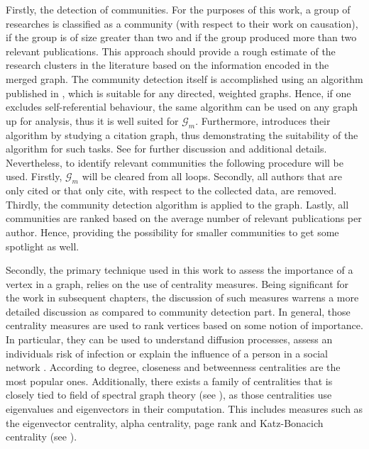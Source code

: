 \documentclass[11pt,a4paper]{book}
\theoremstyle{definition}
\theoremstyle{definition}
\theoremstyle{definition}
\theoremstyle{remark}
\newcommand{\acgraph}{\mathcal{G}_{m}}
\begin{document}
Firstly, the detection of communities. For the purposes of this work, a group of researches is classified as a community (with respect to their work on causation), if the group is of size greater than two and if the group produced more than two relevant publications. This approach should provide a rough estimate of the research clusters in the literature based on the information encoded in the merged graph. 
The community detection itself is accomplished using an algorithm published in \parencite{rosvall2008maps}, which is suitable for any directed, weighted graphs. 
Hence, if one excludes self-referential behaviour, the same algorithm can be used on any graph up for analysis, thus it is well suited for $\acgraph$. Furthermore, \parencite{rosvall2008maps} introduces their algorithm by studying a citation graph, thus demonstrating the suitability of the algorithm for such tasks. See \parencite{rosvall2008maps} for further discussion and additional details. 
Nevertheless, to identify relevant communities the following procedure will be used. 
Firstly, $\acgraph$ will be cleared from all loops. Secondly, all authors that are only cited or that only cite, with respect to the collected data, are removed. 
Thirdly, the community detection algorithm is applied to the graph. Lastly, all communities are ranked based on the average number of relevant publications per author. Hence, providing the possibility for smaller communities to get some spotlight as well.


Secondly, the primary technique used in this work to assess the importance of a vertex in a graph, relies on the use of centrality measures. Being significant for the work in subsequent chapters, the discussion of such measures warrens a more detailed discussion as compared to community detection part. In general, those centrality measures are used to rank vertices based on some notion of importance. In particular, they can be used to understand diffusion processes, assess an individuals risk of infection or explain the influence of a 
person in a social network \parencite{bloch2019centrality}. According to \parencite{del2011centrality} degree, closeness and betweenness centralities are the most popular ones. Additionally, there exists a family of centralities that is closely tied to field of spectral graph theory (see \parencite{spielman2012spectral}), as those centralities use eigenvalues and eigenvectors in their computation. This includes measures such as the eigenvector centrality, alpha centrality, page rank and Katz-Bonacich centrality  (see \parencite{bloch2019centrality}). 
\end{document}
